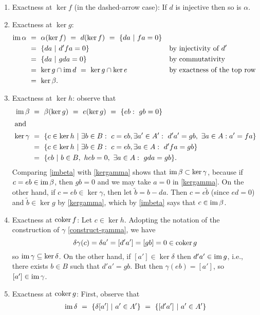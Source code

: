 \begin{enumerate}
\item Exactness at $\ker f$ (in the dashed-arrow case): If $d$ is injective then so is $\alpha$.
\\
\item Exactness at $\ker g$:
\begin{align*}
\operatorname{im}\alpha ~&=~ \alpha(\ker f) ~=~ d(\ker f) ~=~ \{da~|~ fa=0\}\\
~&=~ \{da~|~ d'fa=0\} && \text{by injectivity of $d'$}\\
~&=~ \{da~|~ gda=0\} && \text{by commutativity}\\
~&=~ \ker g\cap \operatorname{im} d ~=~ \ker g\cap\ker e && \text{by exactness of the top row}\\
~&=~ \ker\beta.
\end{align*}
\item Exactness at $\ker h$: observe that
\begin{align}
\im\beta ~&=~ \beta(\ker g) ~=~ e(\ker g) ~=~ \{eb:\ gb=0\} \label{imbeta} \\
\intertext{and}
\ker\gamma ~&=~ \{c\in\ker h\st \exists b\in B:\ c=eb, \exists a'\in A':\ d'a'=gb,\ \exists a\in A: a'=fa\}\notag\\
~&=~ \{c\in\ker h\st \exists b\in B:\ c=eb, \exists a\in A:\ d'fa=gb\}\notag\\
~&=~ \{eb\st b\in B,\ heb=0,\ \exists a\in A:\ gda=gb\}\label{kergamma}.
\end{align}
Comparing \eqref{imbeta} with \eqref{kergamma} shows that $\operatorname{im}\beta\subset\ker\gamma$, because if $c=eb\in\operatorname{im}\beta$,
then $gb=0$ and we may take $a=0$ in \eqref{kergamma}.  On the other hand, if $c=eb\in\ker\gamma$, then let $\tilde b=b-da$.
Then $c=e\tilde b$ (since $ed=0$) and $\tilde b\in\ker g$ by \eqref{kergamma}, which by \eqref{imbeta} says that $c\in\operatorname{im}\beta$.
\\
\item Exactness at $\operatorname{coker} f$: Let $c\in\ker h$.  Adopting the notation of the construction of $\gamma$ \eqref{construct-gamma}, we have 
\[\delta\gamma(c)=\delta a'=[d'a']=[gb]=0\in\operatorname{coker} g\]
so $\operatorname{im}\gamma\subseteq\ker\delta$.  On the other hand, if $[a']\in\ker\delta$ then $d'a'\in\operatorname{im} g$, i.e., there exists $b\in B$ such that $d'a'=gb$.  But then $\gamma(eb)=[a']$, so $[a']\in\operatorname{im}\gamma$.
\\
\item Exactness at $\operatorname{coker} g$: First, observe that
\begin{align*}
\im\delta ~&=~ \{\delta[a']\st a'\in A'\} ~=~ \{[d'a']\st a'\in A'\}\\

\end{align*}
\end{enumerate}
